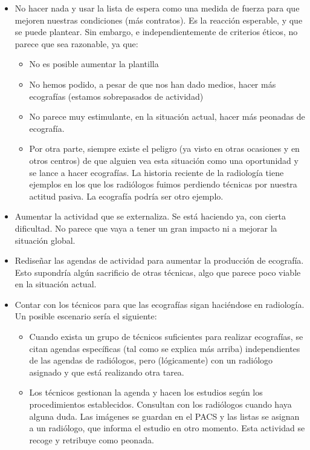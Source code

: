 \documentclass[]{article}
\providecommand{\tightlist}{%
  \setlength{\itemsep}{0pt}\setlength{\parskip}{0pt}}
\begin{document}
\begin{itemize}
\tightlist
\item
  No hacer nada y usar la lista de espera como una medida de fuerza para que mejoren nuestras condiciones (más contratos). Es la reacción esperable, y que se puede plantear. Sin embargo, e independientemente de criterios éticos, no parece que sea razonable, ya que:

  \begin{itemize}
  \tightlist
  \item
    No es posible aumentar la plantilla
  \item
    No hemos podido, a pesar de que nos han dado medios, hacer más ecografías (estamos sobrepasados de actividad)
  \item
    No parece muy estimulante, en la situación actual, hacer más peonadas de ecografía.
  \item
    Por otra parte, siempre existe el peligro (ya visto en otras ocasiones y en otros centros) de que alguien vea esta situación como una oportunidad y se lance a hacer ecografías. La historia reciente de la radiología tiene ejemplos en los que los radiólogos fuimos perdiendo técnicas por nuestra actitud pasiva. La ecografía podría ser otro ejemplo.
  \end{itemize}
\item
  Aumentar la actividad que se externaliza. Se está haciendo ya, con cierta dificultad. No parece que vaya a tener un gran impacto ni a mejorar la situación global.
\item
  Rediseñar las agendas de actividad para aumentar la producción de ecografía. Esto supondría algún sacrificio de otras técnicas, algo que parece poco viable en la situación actual.
\item
  Contar con los técnicos para que las ecografías sigan haciéndose en radiología. Un posible escenario sería el siguiente:

  \begin{itemize}
  \tightlist
  \item
    Cuando exista un grupo de técnicos suficientes para realizar ecografías, se citan agendas específicas (tal como se explica más arriba) independientes de las agendas de radiólogos, pero (lógicamente) con un radiólogo asignado y que está realizando otra tarea.
  \item
    Los técnicos gestionan la agenda y hacen los estudios según los procedimientos establecidos. Consultan con los radiólogos cuando haya alguna duda. Las imágenes se guardan en el PACS y las listas se asignan a un radiólogo, que informa el estudio en otro momento. Esta actividad se recoge y retribuye como peonada.
  \end{itemize}
\end{itemize}
\end{document}
